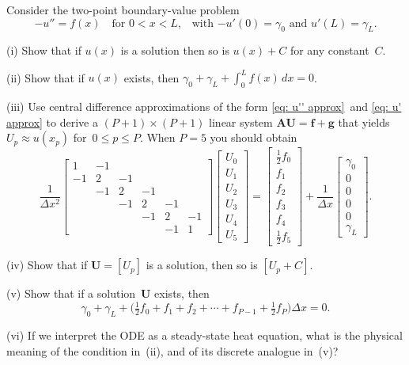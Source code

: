 \begin{Exercises}
\exercise
Consider the two-point boundary-value problem
\[
-u''=f(x)\quad\text{for $0<x<L$,}
	\quad\text{with $-u'(0)=\gamma_0$ and $u'(L)=\gamma_L$.}
\]
\begin{description}
\item{(i)} Show that if $u(x)$ is a solution then so is $u(x)+C$ for any 
constant~$C$.
\item{(ii)} Show that if $u(x)$ exists, then 
$\gamma_0+\gamma_L+\int_0^Lf(x)\,dx=0$.
\item{(iii)} Use central difference approximations of the 
form \eqref{eq: u'' approx}~and \eqref{eq: u' approx} to derive a 
$(P+1)\times(P+1)$ linear system 
$\boldsymbol{A}\boldsymbol{U}=\boldsymbol{f}+\boldsymbol{g}$ that yields
$U_p\approx u(x_p)$ for~$0\le p\le P$.  When $P=5$ you should obtain
\[
\frac{1}{\Delta x^2}\begin{bmatrix}
 1&-1&  &  &  &\\                     
-1& 2&-1&  &  &\\
  &-1& 2&-1&  &\\
  &  &-1& 2&-1&\\
  &  &  &-1& 2&-1\\
  &  &  &  &-1& 1
\end{bmatrix}
\begin{bmatrix}U_0\\ U_1\\ U_2\\ U_3\\ U_4\\ U_5\end{bmatrix}
=\begin{bmatrix}\tfrac12f_0\\ f_1\\ f_2\\ f_3\\ f_4\\ \tfrac12 f_5
\end{bmatrix}
+\frac{1}{\Delta x}
\begin{bmatrix}\gamma_0\\ 0\\ 0\\ 0\\ 0\\ \gamma_L\end{bmatrix}.
\]
\item{(iv)} Show that if $\boldsymbol{U}=[U_p]$ is a solution, then so is 
$[U_p+C]$.
\item{(v)} Show that if a solution~$\boldsymbol{U}$ exists, then
\[
\gamma_0+\gamma_L+\bigl(\tfrac12f_0+f_1+f_2+\cdots+f_{P-1}+\tfrac12f_P\bigr)
\Delta x=0.
\]
\item{(vi)} If we interpret the ODE as a steady-state heat equation, what is 
the physical meaning of the condition in~(ii), and of its discrete analogue 
in~(v)?
\end{description}


\end{Exercises}
